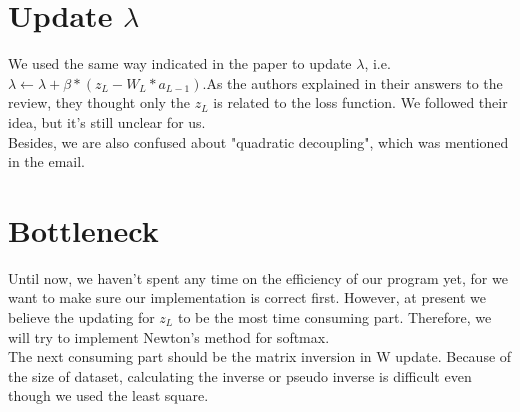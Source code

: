 \documentclass{article}
\begin{document}
\section{Update $\lambda$}
We used the same way indicated in the paper to update $\lambda$, i.e. $\lambda \leftarrow \lambda+\beta*(z_L - W_L*a_{L-1})$.As the authors explained in their answers to the review, they thought only the $z_L$ is related to the loss function. We followed their idea, but it's still unclear for us.\\
Besides, we are also confused about "quadratic decoupling", which was mentioned in the email.
\section{Bottleneck}
Until now, we haven't spent any time on the efficiency of our program yet, for we want to make sure our implementation is correct first. However, at present we believe the updating for $z_L$ to be the most time consuming part. Therefore, we will try to implement Newton's method for softmax.\\
The next consuming part should be the matrix inversion in W update. Because of the size of dataset, calculating the inverse or pseudo inverse is difficult even though we used the least square.\\
 
\end{document}
